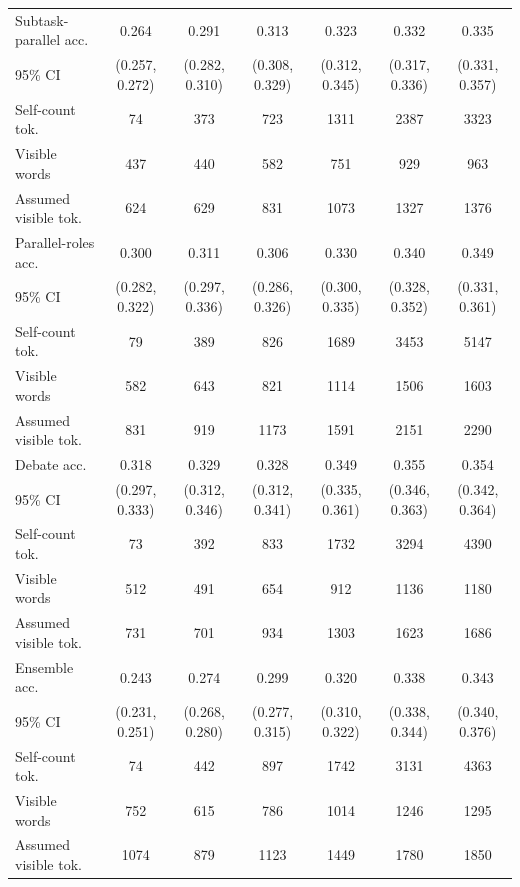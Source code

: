 \documentclass{article} %
\begin{document}
\begin{table}[t]
{\begin{tabular}{lcccccc}
\midrule
Subtask-parallel acc. & 0.264 & 0.291 & 0.313 & 0.323 & 0.332 & 0.335 \\
95\% CI & (0.257, 0.272) & (0.282, 0.310) & (0.308, 0.329) & (0.312, 0.345) & (0.317, 0.336) & (0.331, 0.357) \\
Self-count tok. & 74 & 373 & 723 & 1311 & 2387 & 3323 \\
Visible words & 437 & 440 & 582 & 751 & 929 & 963 \\
Assumed visible tok. & 624 & 629 & 831 & 1073 & 1327 & 1376 \\
\midrule
Parallel-roles acc. & 0.300 & 0.311 & 0.306 & 0.330 & 0.340 & 0.349 \\
95\% CI & (0.282, 0.322) & (0.297, 0.336) & (0.286, 0.326) & (0.300, 0.335) & (0.328, 0.352) & (0.331, 0.361) \\
Self-count tok. & 79 & 389 & 826 & 1689 & 3453 & 5147 \\
Visible words & 582 & 643 & 821 & 1114 & 1506 & 1603 \\
Assumed visible tok. & 831 & 919 & 1173 & 1591 & 2151 & 2290 \\
\midrule
Debate acc. & 0.318 & 0.329 & 0.328 & 0.349 & 0.355 & 0.354 \\
95\% CI & (0.297, 0.333) & (0.312, 0.346) & (0.312, 0.341) & (0.335, 0.361) & (0.346, 0.363) & (0.342, 0.364) \\
Self-count tok. & 73 & 392 & 833 & 1732 & 3294 & 4390 \\
Visible words & 512 & 491 & 654 & 912 & 1136 & 1180 \\
Assumed visible tok. & 731 & 701 & 934 & 1303 & 1623 & 1686 \\
\midrule
Ensemble acc. & 0.243 & 0.274 & 0.299 & 0.320 & 0.338 & 0.343 \\
95\% CI & (0.231, 0.251) & (0.268, 0.280) & (0.277, 0.315) & (0.310, 0.322) & (0.338, 0.344) & (0.340, 0.376) \\
Self-count tok. & 74 & 442 & 897 & 1742 & 3131 & 4363 \\
Visible words & 752 & 615 & 786 & 1014 & 1246 & 1295 \\
Assumed visible tok. & 1074 & 879 & 1123 & 1449 & 1780 & 1850 \\
\bottomrule
\end{tabular}}
\end{table}
\end{document}
